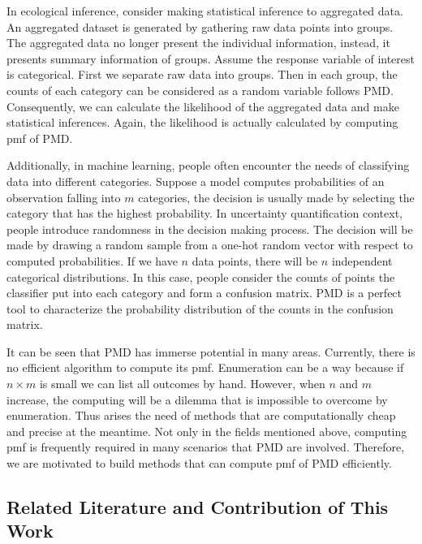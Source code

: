 \documentclass[12pt]{article}
\newcommand{\PMD}{\textrm{PMD}}
\begin{document}
In ecological inference, consider making statistical inference to aggregated data. An aggregated dataset is generated by gathering raw data points into groups. The aggregated data no longer present the individual information, instead, it presents  summary information of groups. Assume the response variable of interest is categorical. First we separate raw data into groups. Then in each group, the counts of each category can be considered as a random variable follows $\PMD$. Consequently, we can calculate the likelihood of the aggregated data and make statistical inferences. Again, the likelihood is actually calculated by computing pmf of $\PMD$.

Additionally, in machine learning, people often encounter the needs of classifying data into different categories. Suppose a model computes probabilities of an observation falling into $m$ categories, the decision is usually made by selecting the category that has the highest probability. In uncertainty quantification context, people introduce randomness in the decision making process.  The decision will be made by drawing a random sample from a one-hot random vector with respect to computed probabilities. If we have $n$ data points, there will be $n$ independent categorical distributions. In this case, people consider the counts of points the classifier put into each category and form a confusion matrix. $\PMD$ is a perfect tool to characterize the probability distribution of the counts in the confusion matrix.

It can be seen that $\PMD$ has immerse potential in many areas. Currently, there is no efficient algorithm to compute its pmf. Enumeration can be a way because if $n \times m$ is small we can list all outcomes by hand. However, when $n$ and $m$ increase, the computing will be a dilemma that is impossible to overcome by enumeration. Thus arises the need of methods that are computationally cheap and precise at the meantime. Not only in the fields mentioned above, computing pmf is frequently required in many scenarios that $\PMD$ are involved. Therefore, we are motivated to build methods that can compute pmf of $\PMD$ efficiently.



\subsection{Related Literature and Contribution of This Work}

\end{document}
